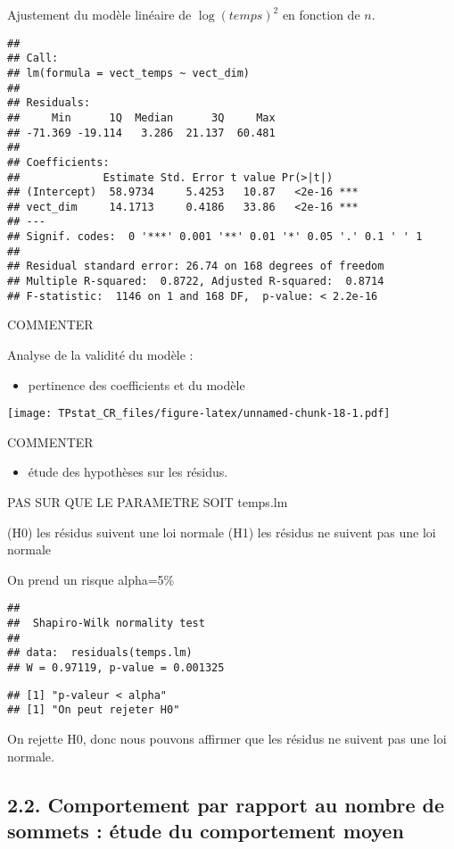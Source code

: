\documentclass[]{article}
\providecommand{\tightlist}{%
  \setlength{\itemsep}{0pt}\setlength{\parskip}{0pt}}
\begin{document}
Ajustement du modèle linéaire de \(\log(temps)^2\) en fonction de \(n\).

\begin{verbatim}
## 
## Call:
## lm(formula = vect_temps ~ vect_dim)
## 
## Residuals:
##     Min      1Q  Median      3Q     Max 
## -71.369 -19.114   3.286  21.137  60.481 
## 
## Coefficients:
##             Estimate Std. Error t value Pr(>|t|)    
## (Intercept)  58.9734     5.4253   10.87   <2e-16 ***
## vect_dim     14.1713     0.4186   33.86   <2e-16 ***
## ---
## Signif. codes:  0 '***' 0.001 '**' 0.01 '*' 0.05 '.' 0.1 ' ' 1
## 
## Residual standard error: 26.74 on 168 degrees of freedom
## Multiple R-squared:  0.8722, Adjusted R-squared:  0.8714 
## F-statistic:  1146 on 1 and 168 DF,  p-value: < 2.2e-16
\end{verbatim}

COMMENTER

Analyse de la validité du modèle :

\begin{itemize}
\tightlist
\item
  pertinence des coefficients et du modèle
\end{itemize}

\texttt{[image: TPstat\_CR\_files/figure-latex/unnamed-chunk-18-1.pdf]}

COMMENTER

\begin{itemize}
\tightlist
\item
  étude des hypothèses sur les résidus.
\end{itemize}

PAS SUR QUE LE PARAMETRE SOIT temps.lm

(H0) les résidus suivent une loi normale (H1) les résidus ne suivent pas
une loi normale

On prend un risque alpha=5\%

\begin{verbatim}
## 
##  Shapiro-Wilk normality test
## 
## data:  residuals(temps.lm)
## W = 0.97119, p-value = 0.001325
\end{verbatim}

\begin{verbatim}
## [1] "p-valeur < alpha"
## [1] "On peut rejeter H0"
\end{verbatim}

On rejette H0, donc nous pouvons affirmer que les résidus ne suivent pas
une loi normale.

\hypertarget{comportement-par-rapport-au-nombre-de-sommets-uxe9tude-du-comportement-moyen}{%
\subsection{2.2. Comportement par rapport au nombre de sommets : étude
du comportement
moyen}\label{comportement-par-rapport-au-nombre-de-sommets-uxe9tude-du-comportement-moyen}}
\end{document}
